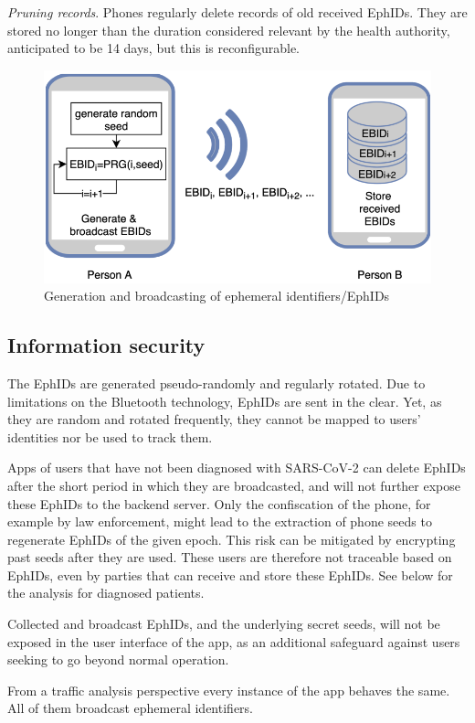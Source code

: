 \documentclass[12pt,a4paper]{article}
\begin{document}
\textit{Pruning records}. Phones regularly delete records of old received EphIDs. They are stored no longer than the duration considered relevant by the health authority, anticipated to be 14 days, but this is reconfigurable.
\begin{figure}[H]
\centering
\includegraphics[scale=0.5]{fig/identifier}
\caption{Generation and broadcasting of ephemeral identifiers/EphIDs}
\label{identifier}
\end{figure}
\subsection*{Information security}
The EphIDs are generated pseudo-randomly and regularly rotated. Due to limitations on the
Bluetooth technology, EphIDs are sent in the clear. Yet, as they are random and rotated
frequently, they cannot be mapped to users’ identities nor be used to track them.


Apps of users that have not been diagnosed with SARS-CoV-2 can delete EphIDs after the
short period in which they are broadcasted, and will not further expose these EphIDs to the backend server. Only the confiscation of the phone, for example by law enforcement, might lead to the extraction of phone seeds to regenerate EphIDs of the given epoch. This risk can be mitigated by encrypting past seeds after they are used. These users are therefore not traceable based on EphIDs, even by parties that can receive and store these EphIDs. See below for the analysis for diagnosed patients.


Collected and broadcast EphIDs, and the underlying secret seeds, will not be exposed in the user interface of the app, as an additional safeguard against users seeking to go beyond normal operation.


From a traffic analysis perspective every instance of the app behaves the same. All of them broadcast ephemeral identifiers.
\end{document}
